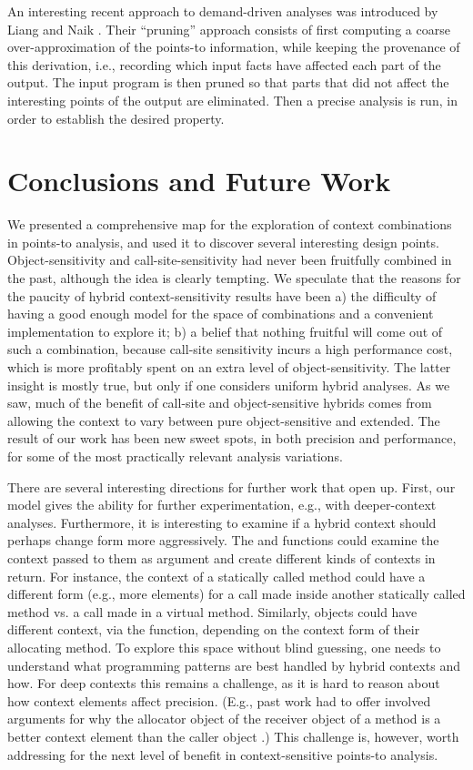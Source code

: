 An interesting recent approach to demand-driven analyses was
introduced by Liang and Naik \cite{pldi:2011:Liang}.
Their ``pruning'' approach consists of first computing a coarse
over-approximation of the points-to information, while keeping the
provenance of this derivation, i.e., recording which input facts have
affected each part of the output. The input program is then pruned so
that parts that did not affect the interesting points of the output
are eliminated. Then a precise analysis is run, in order to establish
the desired property.

\section{Conclusions and Future Work}

We presented a comprehensive map for the exploration of context
combinations in points-to analysis, and used it to discover several
interesting design points. Object-sensitivity and
call-site-sensitivity had never been fruitfully combined in the past,
although the idea is clearly tempting. We speculate that the reasons
for the paucity of hybrid context-sensitivity results have been a) the
difficulty of having a good enough model for the space of combinations
and a convenient implementation to explore it; b) a belief that
nothing fruitful will come out of such a combination, because
call-site sensitivity incurs a high performance cost, which is more
profitably spent on an extra level of object-sensitivity. The latter
insight is mostly true, but only if one considers uniform hybrid
analyses. As we saw, much of the benefit of call-site and
object-sensitive hybrids comes from allowing the context to vary
between pure object-sensitive and extended. The result of our work has
been new sweet spots, in both precision and performance, for some of
the most practically relevant analysis variations.

There are several interesting directions for further work that open
up. First, our model gives the ability for further experimentation,
e.g., with deeper-context analyses. Furthermore, it is interesting to
examine if a hybrid context should perhaps change form more
aggressively. The  and 
functions could examine the context passed to them as argument and
create different kinds of contexts in return. For instance, the
context of a statically called method could have a different form
(e.g., more elements) for a call made inside another statically called
method vs. a call made in a virtual method. Similarly, objects could
have different context, via the  function, depending
on the context form of their allocating method. To explore this space
without blind guessing, one needs to understand what programming
patterns are best handled by hybrid contexts and how. For deep
contexts this remains a challenge, as it is hard to reason about how
context elements affect precision. (E.g., past work had to offer
involved arguments for why the allocator object of the receiver object
of a method is a better context element than the caller object 
\cite{popl:2011:Smaragdakis}.) This challenge is, however, worth addressing
for the next level of benefit in context-sensitive points-to analysis.
